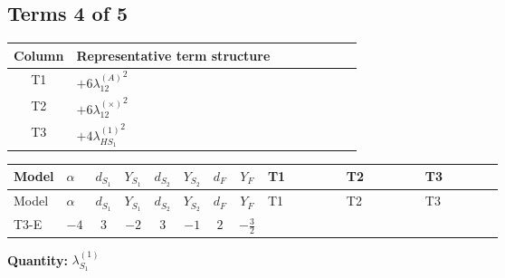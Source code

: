 \documentclass[8pt]{article}
\begin{document}
\begin{landscape}
\subsection*{Terms 4 of 5}
\begin{center}
\begin{tabular}{@{}c >{\raggedright\arraybackslash}p{0.82\linewidth}@{}}
\toprule
Column & Representative term structure \\
\midrule
T1 & \(\displaystyle +6 {\lambda_{12}^{(A)}}^2\) \\
\midrule
T2 & \(\displaystyle +6 {\lambda_{12}^{(\times)}}^2\) \\
\midrule
T3 & \(\displaystyle +4 {\lambda_{HS_1}^{(1)}}^2\) \\
\midrule
\bottomrule
\end{tabular}
\end{center}
\smallskip
\tiny
\begin{longtable}{@{}llcccccc >{\raggedright\arraybackslash}p{0.21\linewidth} >{\raggedright\arraybackslash}p{0.21\linewidth} >{\raggedright\arraybackslash}p{0.21\linewidth}@{}}
\toprule
Model & $\alpha$ & $d_{S_1}$ & $Y_{S_1}$ & $d_{S_2}$ & $Y_{S_2}$ & $d_F$ & $Y_F$ & T1 & T2 & T3 \\
\midrule
\endfirsthead
\toprule
Model & $\alpha$ & $d_{S_1}$ & $Y_{S_1}$ & $d_{S_2}$ & $Y_{S_2}$ & $d_F$ & $Y_F$ & T1 & T2 & T3 \\
\midrule
\endhead
T3-E & $-4$ & $3$ & $-2$ & $3$ & $-1$ & $2$ & $-\frac{3}{2}$ & \scriptsize\adjustbox{max width=\linewidth}{$\begin{gathered} +6 {\lambda_{12}^{(A)}}^2\end{gathered}$} & \scriptsize\adjustbox{max width=\linewidth}{$\begin{gathered} +6 {\lambda_{12}^{(\times)}}^2\end{gathered}$} & \scriptsize\adjustbox{max width=\linewidth}{$\begin{gathered} +4 {\lambda_{HS_1}^{(1)}}^2\end{gathered}$} \\
\midrule
\bottomrule
\end{longtable}
\clearpage
\noindent\textbf{Quantity: }$\lambda_{S_1}^{(1)}$\par\smallskip

\end{landscape}
\end{document}

